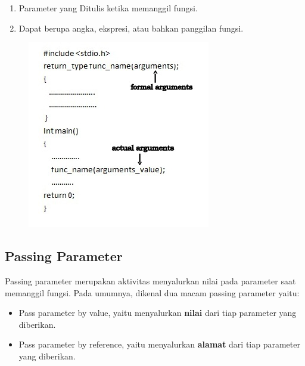 \begin{enumerate}
\begin{enumerate}
              \item Parameter yang Ditulis ketika memanggil fungsi.
              \item Dapat berupa angka, ekspresi, atau bahkan panggilan fungsi.
          \end{enumerate}
          \begin{figure}[H]
              \centering
              \includegraphics[width=0.5\linewidth]{P3/img/screenshot006.png}
              \caption{}
              \label{fig:parameterformalaktual}
          \end{figure}
\end{enumerate}
\subsection{Passing Parameter}
Passing parameter merupakan aktivitas menyalurkan nilai pada parameter saat memanggil fungsi. Pada umumnya, dikenal dua macam passing parameter yaitu:
\begin{itemize}
    \item Pass parameter by value, yaitu menyalurkan \textbf{nilai} dari tiap parameter yang diberikan.
    \item Pass parameter by reference, yaitu menyalurkan \textbf{alamat} dari tiap parameter yang diberikan.
\end{itemize}

